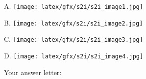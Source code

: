 \begin{figure*}[ht]
\begin{tcolorbox}
\begin{center}
    \begin{minipage}{0.23\textwidth}
        \centering
        A.
        \texttt{[image: latex/gfx/s2i/s2i\_image1.jpg]}
    \end{minipage}
    \hfill
    \begin{minipage}{0.23\textwidth}
        \centering
        B. \vspace{0.1cm}
        \texttt{[image: latex/gfx/s2i/s2i\_image2.jpg]}
    \end{minipage}
    \hfill
    \begin{minipage}{0.23\textwidth}
        \centering
        C. \vspace{0.1cm}
        \texttt{[image: latex/gfx/s2i/s2i\_image3.jpg]}
    \end{minipage}
    \hfill
    \begin{minipage}{0.23\textwidth}
        \centering
        D. \vspace{0.1cm}
        \texttt{[image: latex/gfx/s2i/s2i\_image4.jpg]}
    \end{minipage}
\end{center}

\medskip

Your answer letter: 

\end{tcolorbox}
\end{figure*}

